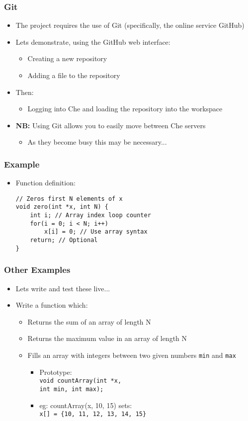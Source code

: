 \documentclass[14pt]{beamer}
\begin{document}
\begin{frame}
\frametitle{Git}
\begin{itemize}
\item The project requires the use of Git (specifically, the online service GitHub)
\item Lets demonstrate, using the GitHub web interface:
	\begin{itemize}
		\item Creating a new repository
		\item Adding a file to the repository
	\end{itemize}
\item Then:
	\begin{itemize}
		\item Logging into Che and loading the repository into the workspace
	\end{itemize}
\item \textbf{NB:} Using Git allows you to easily move between Che servers
	\begin{itemize}
		\item As they become busy this may be necessary...
	\end{itemize}
\end{itemize}
\end{frame}

\begin{frame}[fragile]
\frametitle{Example}
\begin{itemize}
\item Function definition:
\begin{lstlisting}[style=CStyle]
// Zeros first N elements of x
void zero(int *x, int N) {
	int i; // Array index loop counter
	for(i = 0; i < N; i++)
		x[i] = 0; // Use array syntax
	return; // Optional
}
\end{lstlisting}
\end{itemize}
\end{frame}

\begin{frame}
\frametitle{Other Examples}
\begin{itemize}
\item Lets write and test these live...
\item Write a function which:
	\begin{itemize}	
		\item Returns the sum of an array of length N
		\item Returns the maximum value in an array of length N
		\item Fills an array with integers between two given numbers \texttt{min} and \texttt{max}
			\begin{itemize}
				\item Prototype:\\\texttt{void countArray(int *x,\\\quad \quad \quad \quad int min, int max);}
				\item eg: countArray(x, 10, 15) sets:\\ \texttt{x[] = \{10, 11, 12, 13, 14, 15\}}
			\end{itemize}
	\end{itemize}
\end{itemize}
\end{frame}
\end{document}
